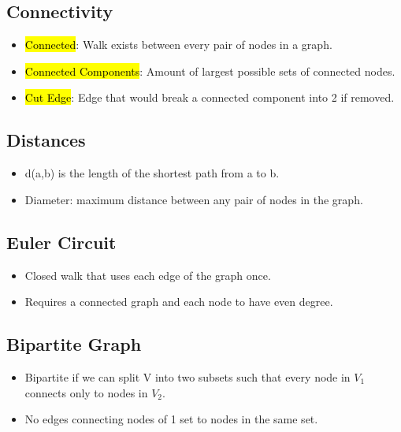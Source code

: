 \subsection{Connectivity}
\begin{itemize}
    \item \hl{Connected}: Walk exists between every pair of nodes in a graph.
    \item \hl{Connected Components}: Amount of largest possible sets of connected nodes.
    \item \hl{Cut Edge}: Edge that would break a connected component into 2 if removed.
\end{itemize}

\subsection{Distances}
\begin{itemize}
    \item d(a,b) is the length of the shortest path from a to b.
    \item Diameter: maximum distance between any pair of nodes in the graph.
\end{itemize}

\subsection{Euler Circuit}
\begin{itemize}
    \item Closed walk that uses each edge of the graph once.
    \item Requires a connected graph and each node to have even degree.
\end{itemize}

\subsection{Bipartite Graph}
\begin{itemize}
    \item Bipartite if we can split V into two subsets such that every node in $V_1$ connects only to nodes in $V_2$.
    \item No edges connecting nodes of 1 set to nodes in the same set.
\end{itemize}